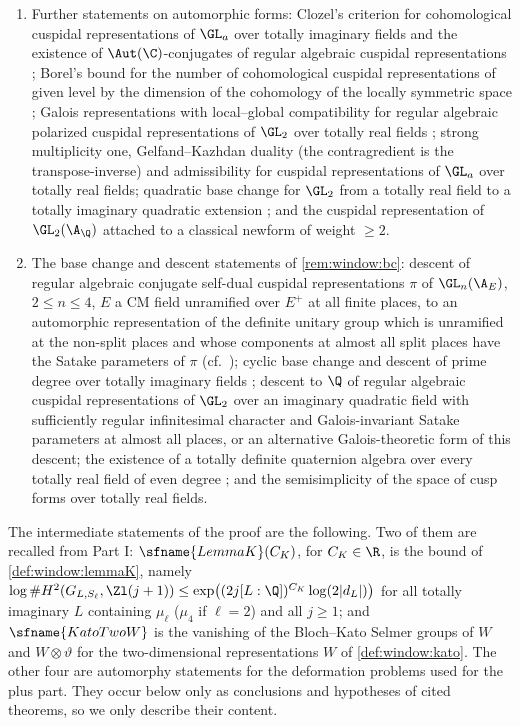 \begin{definition}
\begin{enumerate}[label=(H\arabic*)]
 and Hecke $L$-functions.
\item\label{pf:vwin-he:H2} Further statements on automorphic forms: Clozel's criterion for cohomological cuspidal
 representations of $\GL_a$ over totally imaginary fields and the existence of $\Aut(\C)$-conjugates of regular
 algebraic cuspidal representations \cite{Clozel1990}; Borel's bound for the number of cohomological cuspidal
 representations of given level by the dimension of the cohomology of the locally symmetric space
 \cite{Borel1983}; Galois representations with local--global compatibility for regular algebraic polarized cuspidal
 representations of $\GL_2$ over totally real fields \cite{Carayol1986,Taylor1989}; strong multiplicity one,
 Gelfand--Kazhdan duality (the contragredient is the transpose-inverse) and admissibility for cuspidal
 representations of $\GL_a$ over totally real fields; quadratic base change for $\GL_2$ from a totally real field to
 a totally imaginary quadratic extension \cite{Langlands1980}; and the cuspidal representation of $\GL_2(\A_\Q)$
 attached to a classical newform of weight $\ge2$.
\item\label{pf:vwin-he:H3} The base change and descent statements of \cref{rem:window:bc}: descent of regular
 algebraic conjugate self-dual cuspidal representations $\pi$ of $\GL_n(\A_E)$, $2\le n\le4$, $E$ a CM field
 unramified over $E^+$ at all finite places, to an automorphic representation of the definite unitary group which is
 unramified at the non-split places and whose components at almost all split places have the Satake parameters of
 $\pi$ (cf.\ \cite{Labesse2011}); cyclic base change and descent of prime degree over totally imaginary fields
 \cite{ArthurClozel1989}; descent to $\Q$ of regular algebraic cuspidal representations of $\GL_2$ over an imaginary
 quadratic field with sufficiently regular infinitesimal character and Galois-invariant Satake parameters at almost
 all places, or an alternative Galois-theoretic form of this descent; the existence of a totally definite quaternion
 algebra over every totally real field of even degree \cite{Vigneras1980}; and the semisimplicity of the space of
 cusp forms over totally real fields.
\end{enumerate}
\end{definition}

The intermediate statements of the proof are the following. Two of them are recalled from Part I:
$\sfname{LemmaK}(C_K)$, for $C_K\in\R$, is the bound of \cref{def:window:lemmaK}, namely
$\log\#H^2(G_{L,S_\ell},\Zl(j+1))\le\exp\bigl((2j[L:\Q])^{C_K}\log(2|d_L|)\bigr)$ for all totally imaginary $L$
containing $\mu_\ell$ ($\mu_4$ if $\ell=2$) and all $j\ge1$; and $\sfname{KatoTwoW}$ is the vanishing of the
Bloch--Kato Selmer groups of $W$ and $W\otimes\vartheta$ for the two-dimensional representations $W$ of
\cref{def:window:kato}. The other four are automorphy statements for the deformation problems used for the plus
part. They occur below only as conclusions and hypotheses of cited theorems, so we only describe their content.

